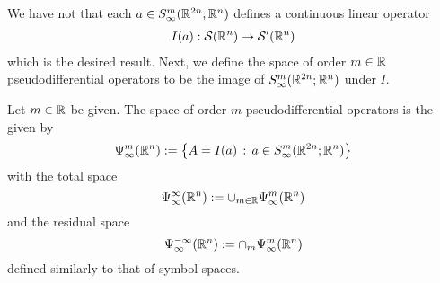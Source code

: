 \documentclass[12pt]{article}
\begin{document}
We have not that each $a \in S^{m}_\infty({\mathbb R}^{2n}; {\mathbb R}^n)$ defines a continuous linear operator 
\begin{align*}
I(a) : \mathcal{S}({\mathbb R}^n) \to \mathcal{S}'({\mathbb R}^n)
\end{align*}
which is the desired result. Next, we define the space of order  $m \in {\ensuremath {\mathbb R}}$ pseudodifferential operators to be the image of $S^{m}_{\infty}({\mathbb R}^{2n}; {\mathbb R}^{n})$ under $I$. 

\begin{fdefinition}
    Let $m \in {\ensuremath {\mathbb R}}$ be given. The space of order $m$ pseudodifferential operators is the given by
    \begin{align*}
    \Psi^{m}_\infty({\mathbb R}^n) := \left\{A = I(a) \, : \, a \in S^{m}_\infty({\mathbb R}^{2n}; {\mathbb R}^n)\right\}
    \end{align*}
    with the total space $$\Psi^{\infty}_\infty({\mathbb R}^n) := \cup_{m \in {\ensuremath {\mathbb R}}} \Psi^m_\infty({\mathbb R}^n)$$ and the residual space $$\Psi^{-\infty}_\infty({\mathbb R}^n) := \cap_m \Psi^m_\infty({\mathbb R}^n)$$ defined similarly to that of symbol spaces. 
\end{fdefinition} 
\end{document}
